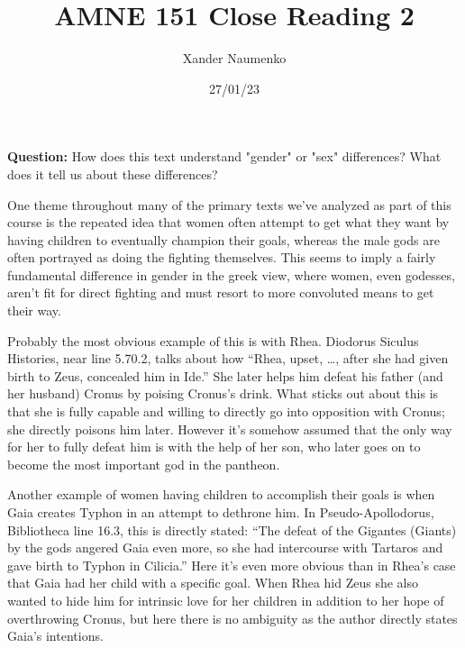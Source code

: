\documentclass[letterpaper, reqno,11pt]{article}
\begin{document}
\title{AMNE 151 Close Reading 2}
\date{27/01/23}
\author{Xander Naumenko}
\maketitle

{\bf Question:} How does this text understand "gender" or "sex" differences? What does it tell us about these differences? 

\medskip

One theme throughout many of the primary texts we've analyzed as part of this course is the repeated idea that women often attempt to get what they want by having children to eventually champion their goals, whereas the male gods are often portrayed as doing the fighting themselves. This seems to imply a fairly fundamental difference in gender in the greek view, where women, even godesses, aren't fit for direct fighting and must resort to more convoluted means to get their way. 

\medskip 

Probably the most obvious example of this is with Rhea. Diodorus Siculus Histories, near line 5.70.2, talks about how ``Rhea, upset, \ldots, after she had given birth to Zeus, concealed him in Ide.'' She later helps him defeat his father (and her husband) Cronus by poising Cronus's drink. What sticks out about this is that she is fully capable and willing to directly go into opposition with Cronus; she directly poisons him later. However it's somehow assumed that the only way for her to fully defeat him is with the help of her son, who later goes on to become the most important god in the pantheon. 

\medskip 

Another example of women having children to accomplish their goals is when Gaia creates Typhon in an attempt to dethrone him. In Pseudo-Apollodorus, Bibliotheca line 16.3, this is directly stated: ``The defeat of the Gigantes (Giants) by the gods angered Gaia even more, so she had intercourse with Tartaros and gave birth to Typhon in Cilicia.'' Here it's even more obvious than in Rhea's case that Gaia had her child with a specific goal. When Rhea hid Zeus she also wanted to hide him for intrinsic love for her children in addition to her hope of overthrowing Cronus, but here there is no ambiguity as the author directly states Gaia's intentions. 

\medskip
\end{document}
